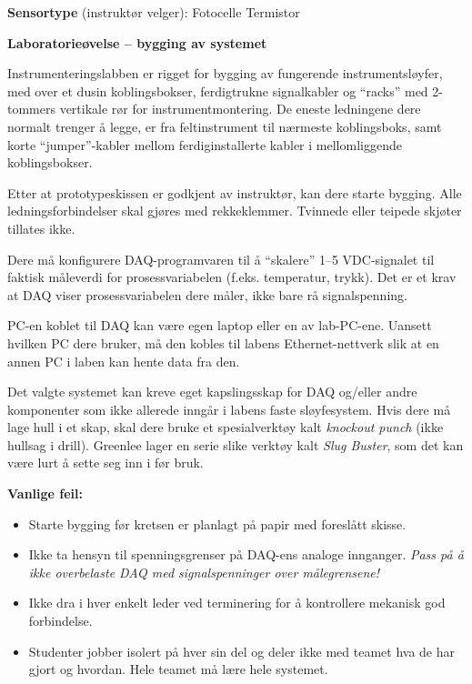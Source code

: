 \vskip 10pt

\noindent
{\bf Sensortype} (instruktør velger): \hskip 20pt \underbar{\hskip 20pt} Fotocelle \hskip 20pt \underbar{\hskip 20pt} Termistor






\vfil \eject

\noindent
{\bf Laboratorieøvelse -- bygging av systemet}

\vskip 5pt

Instrumenteringslabben er rigget for bygging av fungerende instrumentsløyfer, med over et dusin koblingsbokser, ferdigtrukne signalkabler og ``racks'' med 2-tommers vertikale rør for instrumentmontering. De eneste ledningene dere normalt trenger å legge, er fra feltinstrument til nærmeste koblingsboks, samt korte ``jumper''-kabler mellom ferdiginstallerte kabler i mellomliggende koblingsbokser.

Etter at prototypeskissen er godkjent av instruktør, kan dere starte bygging. Alle ledningsforbindelser skal gjøres med rekkeklemmer. Tvinnede eller teipede skjøter tillates ikke.

\vskip 10pt

Dere må konfigurere DAQ-programvaren til å ``skalere'' 1--5 VDC-signalet til faktisk måleverdi for prosessvariabelen (f.eks. temperatur, trykk). Det er et krav at DAQ viser prosessvariabelen dere måler, ikke bare rå signalspenning.

\vskip 10pt

PC-en koblet til DAQ kan være egen laptop eller en av lab-PC-ene. Uansett hvilken PC dere bruker, må den kobles til labens Ethernet-nettverk slik at en annen PC i laben kan hente data fra den.

\vskip 10pt

Det valgte systemet kan kreve eget kapslingsskap for DAQ og/eller andre komponenter som ikke allerede inngår i labens faste sløyfesystem. Hvis dere må lage hull i et skap, skal dere bruke et spesialverktøy kalt {\it knockout punch} (ikke hullsag i drill). Greenlee lager en serie slike verktøy kalt {\it Slug Buster}, som det kan være lurt å sette seg inn i før bruk.

\vskip 10pt

{\bf Vanlige feil:}

\begin{itemize}
\item{} Starte bygging før kretsen er planlagt på papir med foreslått skisse.
\item{} Ikke ta hensyn til spenningsgrenser på DAQ-ens analoge innganger. {\it Pass på å ikke overbelaste DAQ med signalspenninger over målegrensene!}
\item{} Ikke dra i hver enkelt leder ved terminering for å kontrollere mekanisk god forbindelse.
\item{} Studenter jobber isolert på hver sin del og deler ikke med teamet hva de har gjort og hvordan. Hele teamet må lære hele systemet.
\end{itemize}

